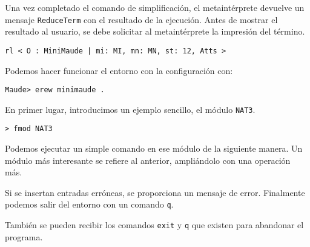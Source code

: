 Una vez completado el comando de simplificación, el metaintérprete devuelve un mensaje \texttt{ReduceTerm} con el resultado de la ejecución. Antes de mostrar el resultado al usuario, se debe solicitar al metaintérprete la impresión del término.

\begin{lstlisting}[language=Maude]
   rl < O : MiniMaude | mi: MI, mn: MN, st: 12, Atts >
\end{lstlisting}
\medskip

Podemos hacer funcionar el entorno con la configuración con:

\begin{lstlisting}[language=Maude]
	Maude> erew minimaude .
\end{lstlisting}
\medskip


En primer lugar, introducimos un ejemplo sencillo, el módulo \texttt{NAT3}.

\begin{lstlisting}[language=Maude]
	> fmod NAT3
\end{lstlisting}
\medskip

Podemos ejecutar un simple comando en ese módulo de la siguiente manera.
Un módulo más interesante se refiere al anterior, ampliándolo con una operación más.

Si se insertan entradas erróneas, se proporciona un mensaje de error.
Finalmente podemos salir del entorno con un comando \texttt{q}.
\medskip


También se pueden recibir los comandos \texttt{exit} y \texttt{q} que existen para abandonar el programa.



